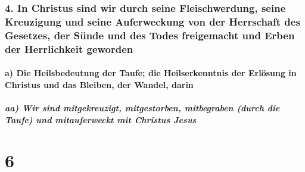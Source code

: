 \hypertarget{in-christus-sind-wir-durch-seine-fleischwerdung-seine-kreuzigung-und-seine-auferweckung-von-der-herrschaft-des-gesetzes-der-suxfcnde-und-des-todes-freigemacht-und-erben-der-herrlichkeit-geworden}{%
\subsubsection{4. In Christus sind wir durch seine Fleischwerdung, seine
Kreuzigung und seine Auferweckung von der Herrschaft des Gesetzes, der
Sünde und des Todes freigemacht und Erben der Herrlichkeit
geworden}\label{in-christus-sind-wir-durch-seine-fleischwerdung-seine-kreuzigung-und-seine-auferweckung-von-der-herrschaft-des-gesetzes-der-suxfcnde-und-des-todes-freigemacht-und-erben-der-herrlichkeit-geworden}}

\hypertarget{a-die-heilsbedeutung-der-taufe-die-heilserkenntnis-der-erluxf6sung-in-christus-und-das-bleiben-der-wandel-darin}{%
\paragraph{a) Die Heilsbedeutung der Taufe; die Heilserkenntnis der
Erlösung in Christus und das Bleiben, der Wandel,
darin}\label{a-die-heilsbedeutung-der-taufe-die-heilserkenntnis-der-erluxf6sung-in-christus-und-das-bleiben-der-wandel-darin}}

\hypertarget{aa-wir-sind-mitgekreuzigt-mitgestorben-mitbegraben-durch-die-taufe-und-mitauferweckt-mit-christus-jesus}{%
\subparagraph{aa) Wir sind mitgekreuzigt, mitgestorben, mitbegraben
(durch die Taufe) und mitauferweckt mit Christus
Jesus}\label{aa-wir-sind-mitgekreuzigt-mitgestorben-mitbegraben-durch-die-taufe-und-mitauferweckt-mit-christus-jesus}}

\hypertarget{section-5}{%
\section{6}\label{section-5}}

